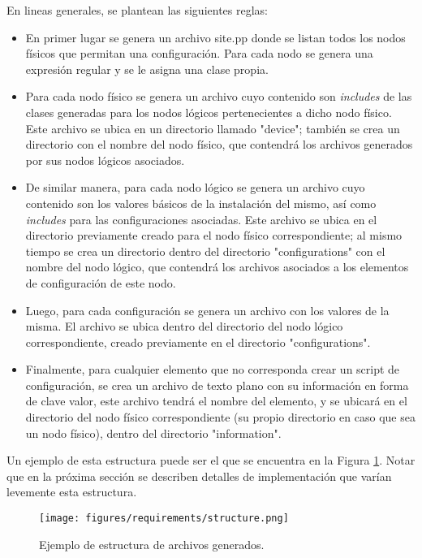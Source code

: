 En lineas generales, se plantean las siguientes reglas:
\begin{itemize}
    \item En primer lugar se genera un archivo site.pp donde se listan todos los nodos físicos que permitan una configuración. Para cada nodo se genera una expresión regular y se le asigna una clase propia.
    \item Para cada nodo físico se genera un archivo cuyo contenido son \textit{includes} de las clases generadas para los nodos lógicos pertenecientes a dicho nodo físico. Este archivo se ubica en un directorio llamado "device"; también se crea un directorio con el nombre del nodo físico, que contendrá los archivos generados por sus nodos lógicos asociados.
    \item De similar manera, para cada nodo lógico se genera un archivo cuyo contenido son los valores básicos de la instalación del mismo, así como \textit{includes} para las configuraciones asociadas. Este archivo se ubica en el directorio previamente creado para el nodo físico correspondiente; al mismo tiempo se crea un directorio dentro del directorio "configurations" con el nombre del nodo lógico, que contendrá los archivos asociados a los elementos de configuración de este nodo.
    \item Luego, para cada configuración se genera un archivo con los valores de la misma. El archivo se ubica dentro del directorio del nodo lógico correspondiente, creado previamente en el directorio "configurations".
    \item Finalmente, para cualquier elemento que no corresponda crear un script de configuración, se crea un archivo de texto plano con su información en forma de clave valor, este archivo tendrá el nombre del elemento, y se ubicará en el directorio del nodo físico correspondiente (su propio directorio en caso que sea un nodo físico), dentro del directorio "information".
\end{itemize}

Un ejemplo de esta estructura puede ser el que se encuentra en la Figura \ref{fig:requirements:file_structure}. Notar que en la próxima sección se describen detalles de implementación que varían levemente esta estructura.

\begin{figure}[H]
    \centering
    \texttt{[image: figures/requirements/structure.png]}
    \caption{Ejemplo de estructura de archivos generados.}
    \label{fig:requirements:file_structure}
\end{figure}
